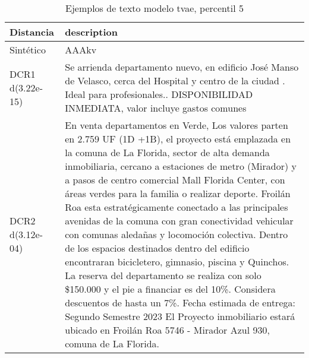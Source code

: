 \begin{table}[H]
\centering
\fontsize{10}{14}\selectfont
\caption{Ejemplos de texto modelo tvae, percentil 5}
\label{table-example-economicos-b-2-tvae-5p-text}
\begin{tabular}{|l|m{35em}|}
\hline
\rowcolor[gray]{0.8}
Distancia & description \\
\hline Sintético & AAAkv \\
\hline DCR1 d(3.22e-15) & Se arrienda departamento nuevo, en edificio Jos\'e Manso de Velasco, cerca del Hospital y centro de la ciudad . Ideal para profesionales.. DISPONIBILIDAD INMEDIATA, valor incluye gastos comunes  \\
\hline DCR2 d(3.12e-04) & En venta departamentos en Verde, Los valores parten en 2.759 UF (1D +1B), el proyecto est\'a emplazada en la comuna de La Florida, sector de alta demanda inmobiliaria, cercano a estaciones de metro (Mirador) y a pasos de centro comercial Mall Florida Center, con \'areas verdes para la familia o realizar deporte. Froil\'an Roa esta estrat\'egicamente conectado a las principales avenidas de la comuna con gran conectividad vehicular con comunas aleda\~nas y locomoci\'on colectiva. Dentro de los espacios destinados dentro del edificio encontraran bicicletero, gimnasio, piscina y Quinchos.
La reserva del departamento se realiza con solo \$150.000 y el pie a financiar es del 10\%. Considera descuentos de hasta un 7\%.
Fecha estimada de entrega: Segundo Semestre 2023
El Proyecto inmobiliario estar\'a ubicado en Froil\'an Roa 5746 - Mirador Azul 930,  comuna de La Florida. \\
\hline
\end{tabular}
\end{table}
